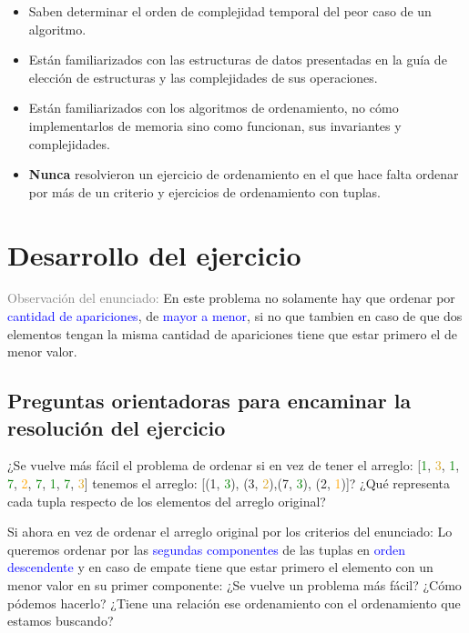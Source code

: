 \documentclass{article}
\newcommand{\meta}[1]{\textcolor{gray}{#1}}
\begin{document}
\begin{itemize}
    \setlength{\itemsep}{0.01em}
    \item Saben determinar el orden de complejidad temporal del peor caso de un algoritmo.
    \item Están familiarizados con las estructuras de datos presentadas en la guía de elección de estructuras y las complejidades de sus operaciones.
    \item Están familiarizados con los algoritmos de ordenamiento, no cómo implementarlos de memoria sino como funcionan, sus invariantes y complejidades.
    \item \textbf{Nunca} resolvieron un ejercicio de ordenamiento en el que hace falta ordenar por más de un criterio y ejercicios de ordenamiento con tuplas.
    \end{itemize}

\vspace{-0.95em}
\section*{Desarrollo del ejercicio}
\meta{Observación del enunciado:} En este problema no solamente hay que ordenar por \textcolor{blue}{cantidad de apariciones}, de \textcolor{blue}{mayor a menor}, si no que tambien en caso de que dos elementos tengan la \textcolor{violetDark}{misma cantidad de apariciones} tiene que estar primero el de \textcolor{violetDark}{menor valor}. 

\subsection{Preguntas orientadoras para encaminar la resolución del ejercicio}
¿Se vuelve más fácil el problema de ordenar si en vez de tener el arreglo: [\textcolor{green}{1}, \textcolor{goldenrod}{3}, \textcolor{green}{1}, \textcolor{green}{7}, \textcolor{orange}{2}, \textcolor{green}{7}, \textcolor{green}{1}, \textcolor{green}{7}, \textcolor{goldenrod}{3}] tenemos el arreglo: 
[(1, \textcolor{green}{3}), (3, \textcolor{goldenrod}{2}),(7, \textcolor{green}{3}), (2, \textcolor{orange}{1})]? 
¿Qué representa cada tupla respecto de los elementos del arreglo original?

Si ahora en vez de ordenar el arreglo original por los criterios del enunciado: Lo queremos ordenar por las \textcolor{blue}{segundas componentes} de las tuplas en \textcolor{blue}{orden descendente} y en \textcolor{violetDark}{caso de empate} tiene que estar primero el elemento con un \textcolor{violetDark}{menor valor en su primer componente}: ¿Se vuelve un problema más fácil? ¿Cómo pódemos hacerlo? ¿Tiene una relación ese ordenamiento con el ordenamiento que estamos buscando?
\end{document}
